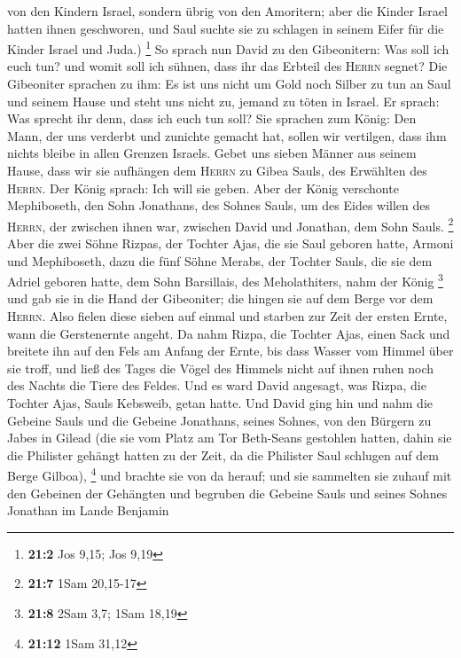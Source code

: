 von den Kindern Israel, sondern übrig von den Amoritern; aber die Kinder
Israel hatten ihnen geschworen, und Saul suchte sie zu schlagen in
seinem Eifer für die Kinder Israel und Juda.) \footnote{\textbf{21:2}
  Jos 9,15; Jos 9,19}  So sprach nun David zu den
Gibeonitern: Was soll ich euch tun? und womit soll ich sühnen, dass ihr
das Erbteil des \textsc{Herrn} segnet?  Die Gibeoniter
sprachen zu ihm: Es ist uns nicht um Gold noch Silber zu tun an Saul und
seinem Hause und steht uns nicht zu, jemand zu töten in Israel. Er
sprach: Was sprecht ihr denn, dass ich euch tun soll?  Sie
sprachen zum König: Den Mann, der uns verderbt und zunichte gemacht hat,
sollen wir vertilgen, dass ihm nichts bleibe in allen Grenzen Israels.
 Gebet uns sieben Männer aus seinem Hause, dass wir sie
aufhängen dem \textsc{Herrn} zu Gibea Sauls, des Erwählten des
\textsc{Herrn}. Der König sprach: Ich will sie geben. 
Aber der König verschonte Mephiboseth, den Sohn Jonathans, des Sohnes
Sauls, um des Eides willen des \textsc{Herrn}, der zwischen ihnen war,
zwischen David und Jonathan, dem Sohn Sauls. \footnote{\textbf{21:7}
  1Sam 20,15-17}  Aber die zwei Söhne Rizpas, der Tochter
Ajas, die sie Saul geboren hatte, Armoni und Mephiboseth, dazu die fünf
Söhne Merabs, der Tochter Sauls, die sie dem Adriel geboren hatte, dem
Sohn Barsillais, des Meholathiters, nahm der König \footnote{\textbf{21:8}
  2Sam 3,7; 1Sam 18,19}  und gab sie in die Hand der
Gibeoniter; die hingen sie auf dem Berge vor dem \textsc{Herrn}. Also
fielen diese sieben auf einmal und starben zur Zeit der ersten Ernte,
wann die Gerstenernte angeht.  Da nahm Rizpa, die Tochter
Ajas, einen Sack und breitete ihn auf den Fels am Anfang der Ernte, bis
dass Wasser vom Himmel über sie troff, und ließ des Tages die Vögel des
Himmels nicht auf ihnen ruhen noch des Nachts die Tiere des Feldes.
 Und es ward David angesagt, was Rizpa, die Tochter Ajas,
Sauls Kebsweib, getan hatte.  Und David ging hin und nahm
die Gebeine Sauls und die Gebeine Jonathans, seines Sohnes, von den
Bürgern zu Jabes in Gilead (die sie vom Platz am Tor Beth-Seans
gestohlen hatten, dahin sie die Philister gehängt hatten zu der Zeit, da
die Philister Saul schlugen auf dem Berge Gilboa), \footnote{\textbf{21:12}
  1Sam 31,12}  und brachte sie von da herauf; und sie
sammelten sie zuhauf mit den Gebeinen der Gehängten  und
begruben die Gebeine Sauls und seines Sohnes Jonathan im Lande Benjamin
